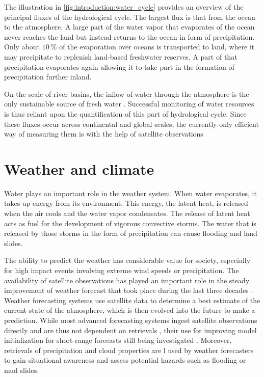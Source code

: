 The illustration in
\ref{fig:introduction:water_cycle} provides an overview of the principal fluxes
of the hydrological cycle. The largest flux is that from the ocean to the
atmosphere. A large part of the water vapor that evaporates of the ocean never
reaches the land but instead returns to the ocean in form of precipitation. Only
about $\SI{10}{\percent}$ of the evaporation over oceans is transported to land,
where it may precipitate to replenish land-based freshwater reserves. A part of
that precipitation evaporates again allowing it to take part in the formation of
precipitation further inland.

On the scale of river basins, the inflow of water through the atmosphere is the
only sustainable source of fresh water \citep{falkenmark04}. Successful
monitoring of water resources is thus reliant upon the quantification of this
part of hydrological cycle. Since these fluxes occur across continental and
global scales, the currently only efficient way of measuring them is with the
help of satellite observations

\section{Weather and climate}

Water plays an important role in the weather system. When water evaporates, it
takes up energy from its environment. This energy, the latent heat, is released
when the air cools and the water vapor condensates. The release of latent heat
acts as fuel for the development of vigorous convective storms. The water that
is released by those storms in the form of precipitation can cause flooding and
land slides.

The ability to predict the weather has considerable value for society,
especially for high impact events involving extreme wind speeds or
precipitation. The availability of satellite observations has played an
important role in the steady improvement of weather forecast that took place
during the last three decades
\citep{bauer15}. Weather forecasting  systems use satellite data to
determine a best estimate of the current state of the atmosphere, which is then
evolved into the future to make a prediction. While most advanced forecasting
systems ingest satellite observations directly and are thus not dependent on
retrievals \citep{bauer10}, their use for improving model initialization for
short-range forecasts still being investigated
\citep{dehaan14, benjamin21}. Moreover, retrievals of precipitation and
cloud properties are l used by weather forecasters to gain situational awareness
and assess potential hazards such as flooding or mud slides.

